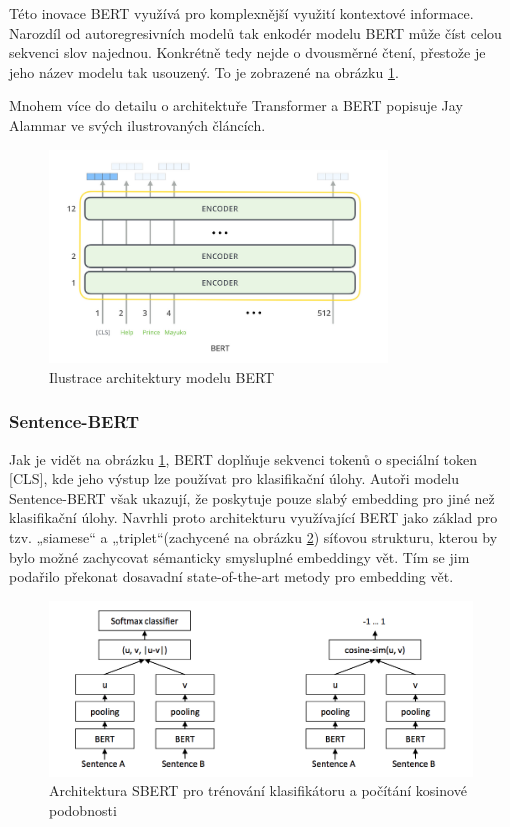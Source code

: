 \documentclass[thesis=M,czech]{FITthesis}[2019/12/23]
\begin{document}
Této inovace BERT využívá pro komplexnější využití kontextové informace. Narozdíl od autoregresivních modelů tak enkodér modelu BERT může číst celou sekvenci slov najednou. Konkrétně tedy nejde o dvousměrné čtení, přestože je jeho název modelu tak usouzený. To je zobrazené na obrázku \ref{fig:alammar2018BERT}.

Mnohem více do detailu o architektuře Transformer a BERT popisuje Jay Alammar ve svých ilustrovaných článcích\cite{alammar2018}\cite{alammar2018b}.
\begin{figure}\centering
	\includegraphics[width=0.8\textwidth]{images/alammar2018_BERT.png}
	\caption{Ilustrace architektury modelu BERT\cite{alammar2018}}\label{fig:alammar2018BERT}
\end{figure}

\subsubsection{Sentence-BERT}
Jak je vidět na obrázku \ref{fig:alammar2018BERT}, BERT doplňuje sekvenci tokenů o speciální token [CLS], kde jeho výstup lze používat pro klasifikační úlohy. Autoři modelu Sentence-BERT však ukazují\cite{reimers2019}, že poskytuje pouze slabý embedding pro jiné než klasifikační úlohy. Navrhli proto architekturu využívající BERT jako základ pro tzv. „siamese“ a „triplet“(zachycené na obrázku  \ref{fig:palachy2019SBERT}) síťovou strukturu, kterou by bylo možné zachycovat sémanticky smysluplné embeddingy vět. Tím se jim podařilo překonat dosavadní state-of-the-art metody pro embedding vět.
\begin{figure}\centering
	\includegraphics[width=\textwidth]{images/palachy2019/palachy2019_SBERT.png}
	\caption{Architektura SBERT pro trénování klasifikátoru a počítání kosinové podobnosti\cite{palachy2019}}\label{fig:palachy2019SBERT}
\end{figure}
\end{document}
